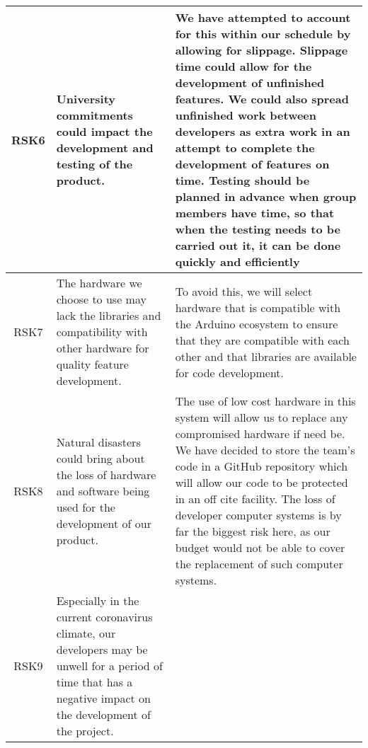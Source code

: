 \begin{xltabular}[H]{\textwidth}{c | X | X}
    RSK6

    &

    University commitments could impact the development and testing of the product.

    &

    We have attempted to account for this within our schedule by allowing for slippage. Slippage time could allow for the development of unfinished features. We could also spread unfinished work between developers as extra work in an attempt to complete the development of features on time. \textbf{Testing should be planned in advance when group members have time, so that when the testing needs to be carried out it, it can be done quickly and efficiently}\\

    \midrule

    RSK7

    &

    The hardware we choose to use may lack the libraries and compatibility with other hardware for quality feature development.

    &

    To avoid this, we will select hardware that is compatible with the Arduino ecosystem to ensure that they are compatible with each other and that libraries are available for code development.\\

    \midrule

    RSK8

    &

    Natural disasters could bring about the loss of hardware and software being used for the development of our product.

    &

    The use of low cost hardware in this system will allow us to replace any compromised hardware if need be. We have decided to store the team's code in a GitHub repository which will allow our code to be protected in an off cite facility. The loss of developer computer systems is by far the biggest risk here, as our budget would not be able to cover the replacement of such computer systems.\\

    \midrule

    RSK9

    &

    Especially in the current coronavirus climate, our developers may be unwell for a period of time that has a negative impact on the development of the project.


\end{xltabular}
